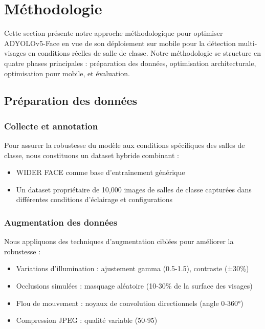 \chapter{Méthodologie}
\begin{onehalfspace}


\hspace{0.65cm} Cette section présente notre approche méthodologique pour optimiser ADYOLOv5-Face en vue de son déploiement sur mobile pour la détection multi-visages en conditions réelles de salle de classe. Notre méthodologie se structure en quatre phases principales : préparation des données, optimisation architecturale, optimisation pour mobile, et évaluation.

\section{Préparation des données}

\subsection{Collecte et annotation}
\hspace{0.65cm} Pour assurer la robustesse du modèle aux conditions spécifiques des salles de classe, nous constituons un dataset hybride combinant :
\begin{itemize}
    \item WIDER FACE comme base d'entraînement générique
    \item Un dataset propriétaire de 10,000 images de salles de classe capturées dans différentes conditions d'éclairage et configurations
\end{itemize}

\subsection{Augmentation des données}
\hspace{0.65cm} Nous appliquons des techniques d'augmentation ciblées pour améliorer la robustesse :
\begin{itemize}
    \item Variations d'illumination : ajustement gamma (0.5-1.5), contraste (±30\%)
    \item Occlusions simulées : masquage aléatoire (10-30\% de la surface des visages)
    \item Flou de mouvement : noyaux de convolution directionnels (angle 0-360°)
    \item Compression JPEG : qualité variable (50-95)
\end{itemize}


\end{onehalfspace}
